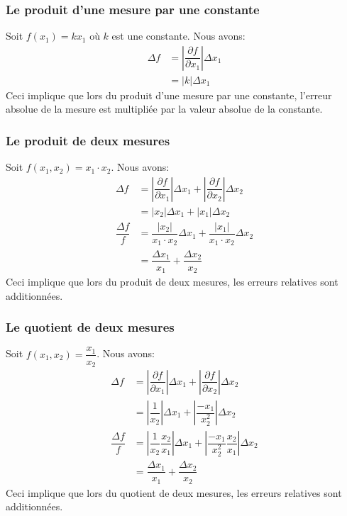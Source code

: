 \documentclass[]{book}
\theoremstyle{definition}
\theoremstyle{definition}
\theoremstyle{definition}
\theoremstyle{remark}
\begin{document}
\hypertarget{le-produit-dune-mesure-par-une-constante}{%
\subsubsection{Le produit d'une mesure par une
constante}\label{le-produit-dune-mesure-par-une-constante}}

Soit \(f(x_1)=kx_1\) où \(k\) est une constante. Nous avons:
\begin{align*}
\Delta f &= \left| \dfrac{\partial f}{\partial x_1} \right| \Delta x_1 \\
&= |k| \Delta x_1
\end{align*} Ceci implique que lors du produit d'une mesure par une
constante, l'erreur absolue de la mesure est multipliée par la valeur
absolue de la constante.

\hypertarget{le-produit-de-deux-mesures}{%
\subsubsection{Le produit de deux
mesures}\label{le-produit-de-deux-mesures}}

Soit \(f(x_1,x_2)=x_1 \cdot x_2\). Nous avons: \begin{align*}
\Delta f &= \left| \dfrac{\partial f}{\partial x_1} \right| \Delta x_1
+ \left| \dfrac{\partial f}{\partial x_2} \right| \Delta x_2 \\
&= |x_2| \Delta x_1 + |x_1| \Delta x_2 \\
\dfrac{\Delta f}{f} &= \dfrac{|x_2|}{x_1\cdot x_2}\Delta x_1 + \dfrac{|x_1|}{x_1\cdot x_2}\Delta x_2 \\
&= \dfrac{\Delta x_1}{x_1} + \dfrac{\Delta x_2}{x_2}
\end{align*} Ceci implique que lors du produit de deux mesures, les
erreurs relatives sont additionnées.

\hypertarget{le-quotient-de-deux-mesures}{%
\subsubsection{Le quotient de deux
mesures}\label{le-quotient-de-deux-mesures}}

Soit \(f(x_1,x_2)=\dfrac{x_1}{x_2}\). Nous avons: \begin{align*}
\Delta f &= \left| \dfrac{\partial f}{\partial x_1} \right| \Delta x_1
+ \left| \dfrac{\partial f}{\partial x_2} \right| \Delta x_2 \\
&= \left| \dfrac{1}{x_2} \right| \Delta x_1 + \left| \dfrac{-x_1}{x_2^2} \right| \Delta x_2 \\
\dfrac{\Delta f}{f} &= \left| \dfrac{1}{x_2}\dfrac{x_2}{x_1} \right| \Delta x_1 + \left| \dfrac{-x_1}{x_2^2}\dfrac{x_2}{x_1} \right| \Delta x_2 \\
&= \dfrac{\Delta x_1}{x_1} + \dfrac{\Delta x_2}{x_2}
\end{align*} Ceci implique que lors du quotient de deux mesures, les
erreurs relatives sont additionnées.
\end{document}
